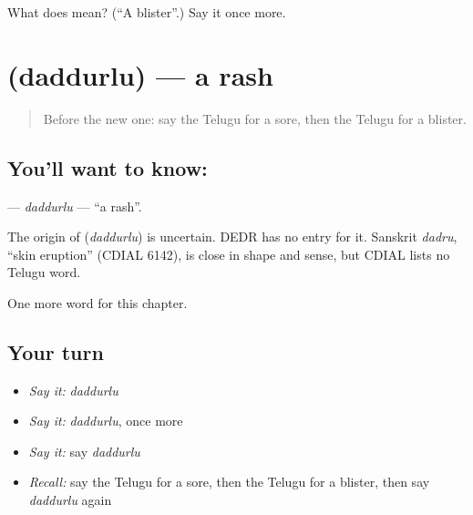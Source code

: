 \begin{tcolorbox}[breakable,colback=teal!4,colframe=teal!35!black,title={Before you move on}]
What does  mean? (\textquotedblleft{}A blister\textquotedblright{}.) Say it once more.
\end{tcolorbox}
\section[\texorpdfstring{\te{దద్దుర్లు} (daddurlu)}{దద్దుర్లు (daddurlu)}]{ (daddurlu) — a rash}

\label{lesson:TE-C169-daddurlu}



\begin{quote}
Before the new one: say the Telugu for a sore, then the Telugu for a blister.
\end{quote}

\subsection*{You'll want to know: }
\textbf{} — \emph{daddurlu} — \textquotedblleft{}a rash\textquotedblright{}.

\begin{cousinweb}
The origin of \textbf{} (\emph{daddurlu}) is uncertain. DEDR has no entry for it. Sanskrit \emph{dadru}, \textquotedblleft{}skin eruption\textquotedblright{} (CDIAL 6142), is close in shape and sense, but CDIAL lists no Telugu word.
\end{cousinweb}

\begin{grammarlens}[title={What you've built}]
One more word for this chapter.
\end{grammarlens}

\subsection*{Your turn}
\begin{itemize}
\raggedright
  \item \emph{Say it:} \emph{daddurlu}
  \item \emph{Say it:} \emph{daddurlu}, once more
  \item \emph{Say it:} say \emph{daddurlu}
  \item \emph{Recall:} say the Telugu for a sore, then the Telugu for a blister, then say \emph{daddurlu} again
\end{itemize}

